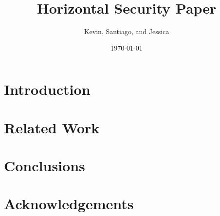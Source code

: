 \documentclass[twocolumn]{article}
\title{Horizontal Security Paper}
\author{Kevin, Santiago, and Jessica}
\date{\today}
\begin{document}
\maketitle

\begin{abstract}

\end{abstract}

\section{Introduction}
\label{sec:Introduction}


\section{Related Work}
\label{sec:RelatedWork}


\section{Conclusions}
\label{sec:Conclusions}


\section{Acknowledgements}
\label{sec:Acknowledgements}




\end{document}
